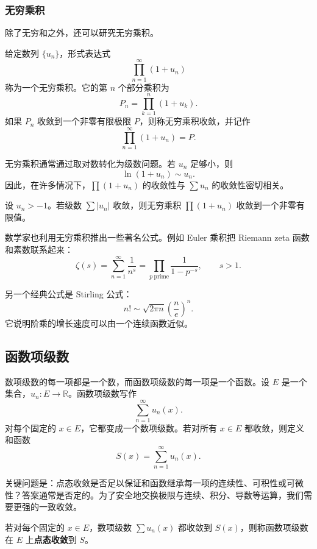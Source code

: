 \subsubsection{无穷乘积}

除了无穷和之外，还可以研究无穷乘积。

\begin{definition}[无穷乘积]
给定数列 $\{u_n\}$，形式表达式
\[
    \prod_{n=1}^{\infty}(1+u_n)
\]
称为一个无穷乘积。它的第 $n$ 个部分乘积为
\[
    P_n=\prod_{k=1}^{n}(1+u_k).
\]
如果 $P_n$ 收敛到一个非零有限极限 $P$，则称无穷乘积收敛，并记作
\[
    \prod_{n=1}^{\infty}(1+u_n)=P.
\]
\end{definition}

无穷乘积通常通过取对数转化为级数问题。若 $u_n$ 足够小，则
\[
    \ln(1+u_n)\sim u_n.
\]
因此，在许多情况下，$\prod(1+u_n)$ 的收敛性与 $\sum u_n$ 的收敛性密切相关。

\begin{theorem}
设 $u_n>-1$。若级数 $\sum |u_n|$ 收敛，则无穷乘积 $\prod(1+u_n)$ 收敛到一个非零有限值。
\end{theorem}

数学家也利用无穷乘积推出一些著名公式。例如 Euler 乘积把 Riemann zeta 函数和素数联系起来：
\[
    \zeta(s)=\sum_{n=1}^{\infty}\frac{1}{n^s}
    =\prod_{p\ \mathrm{prime}}\frac{1}{1-p^{-s}},
    \qquad s>1.
\]

另一个经典公式是 Stirling 公式：
\[
    n!\sim \sqrt{2\pi n}\left(\frac{n}{e}\right)^n.
\]
它说明阶乘的增长速度可以由一个连续函数近似。

\subsection{函数项级数}

数项级数的每一项都是一个数，而函数项级数的每一项是一个函数。设 $E$ 是一个集合，$u_n:E\to\mathbb{R}$。函数项级数写作
\[
    \sum_{n=1}^{\infty}u_n(x).
\]
对每个固定的 $x\in E$，它都变成一个数项级数。若对所有 $x\in E$ 都收敛，则定义和函数
\[
    S(x)=\sum_{n=1}^{\infty}u_n(x).
\]

关键问题是：点态收敛是否足以保证和函数继承每一项的连续性、可积性或可微性？答案通常是否定的。为了安全地交换极限与连续、积分、导数等运算，我们需要更强的一致收敛。

\begin{definition}[点态收敛]
若对每个固定的 $x\in E$，数项级数 $\sum u_n(x)$ 都收敛到 $S(x)$，则称函数项级数在 $E$ 上\textbf{点态收敛}到 $S$。
\end{definition}

